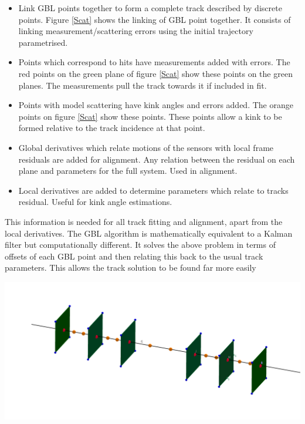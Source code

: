 \documentclass[a0,portrait]{a0poster}
\begin{document}
\begin{multicols}{2}
\begin{tcolorbox}
\begin{itemize}
\item Link GBL points together to form a complete track described by discrete points.
Figure \ref{Scat} shows the linking of GBL point together. It consists of linking measurement/scattering errors using the initial trajectory parametrised.
\item Points which correspond to hits have measurements added with errors. The red points on the green plane of figure \ref{Scat} show these points on the green planes. The measurements pull the track towards it if included in fit.
\item Points with model scattering have kink angles and errors added. The orange points on figure \ref{Scat} show these points. These points allow a kink to be formed relative to the track incidence at that point.
\item Global derivatives which relate motions of the sensors with local frame residuals are added for alignment.
Any relation between the residual on each plane and parameters for the full system. Used in alignment.
\item Local derivatives are added to determine parameters which relate to tracks residual. Useful for kink angle estimations.
\end{itemize}

This information is needed for all track fitting and alignment, apart from the local derivatives. The GBL algorithm is mathematically equivalent to a Kalman filter but computationally different. It solves the above problem in terms of offsets of each GBL point and then relating this back to the usual track parameters. This allows the track solution to be found far more easily

\end{tcolorbox}
\begin{center}
\includegraphics[width=1.0\linewidth]{figures/meas-scat-jac-link.png}
\label{Scat}
\end{center}

\end{multicols}
\end{document}
